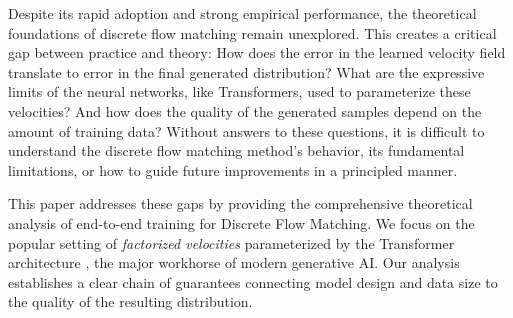 \documentclass[12pt]{article}
\numberwithin{equation}{section}
\let\cite\citep
\theoremstyle{theoremstyle}
\numberwithin{equation}{section}
\numberwithin{theorem}{section}
\numberwithin{proposition}{section}
\numberwithin{definition}{section}
\numberwithin{lemma}{section}
\numberwithin{assumption}{section}
\numberwithin{remark}{section}
\begin{document}
Despite its rapid adoption and strong empirical performance, the theoretical foundations of discrete flow matching remain unexplored. 
This creates a critical gap between practice and theory: How does the error in the learned velocity field translate to error in the final generated distribution? What are the expressive limits of the neural networks, like Transformers, used to parameterize these velocities? And how does the quality of the generated samples depend on the amount of training data? Without answers to these questions, it is difficult to understand the discrete flow matching method's behavior, its fundamental limitations, or how to guide future improvements in a principled manner.


This paper addresses these gaps by providing the comprehensive theoretical analysis of end-to-end training for Discrete Flow Matching.
We focus on the popular setting of \textit{factorized velocities} \cite{lipman2024flow} parameterized by the Transformer architecture \cite{vaswani2017attention,gat2024discrete}, the major workhorse of modern generative AI.
Our analysis establishes a clear chain of guarantees connecting model design and data size to the quality of the resulting distribution. 
\end{document}
